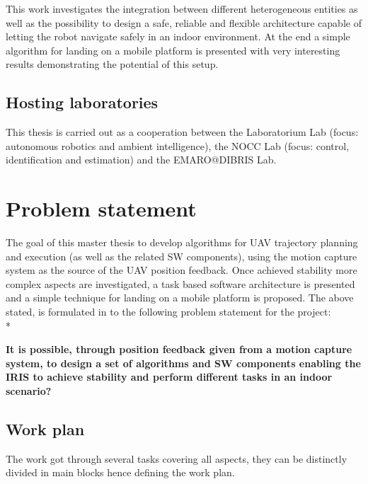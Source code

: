 This work investigates the integration between different heterogeneous entities as well as the possibility to design a safe, reliable and flexible architecture capable of letting the robot navigate safely in an indoor environment. At the end a simple algorithm for landing on a mobile platform is presented with very interesting results demonstrating the potential of this setup.

\subsection{Hosting laboratories}
This thesis is carried out as a cooperation between the Laboratorium Lab (focus:
autonomous robotics and ambient intelligence), the NOCC Lab (focus: control,
identification and estimation) and the EMARO@DIBRIS Lab.

\newpage

\section{Problem statement}

The goal of this master thesis to develop algorithms for UAV trajectory planning and execution (as well as the related SW components), using the motion capture system as the source of the UAV position feedback. Once achieved stability more complex aspects are investigated, a task based software architecture is presented and a simple technique for landing on a mobile platform is proposed.
The above stated, is formulated in to the following problem statement for the project: \\*

\noindent
\textbf{It is possible, through position feedback given from a motion capture system, to design a set of algorithms and SW components enabling the IRIS to achieve stability and perform different tasks in an indoor scenario? }

\subsection{Work plan}
The work got through several tasks covering all aspects, they can be distinctly divided in main blocks hence defining the work plan.

